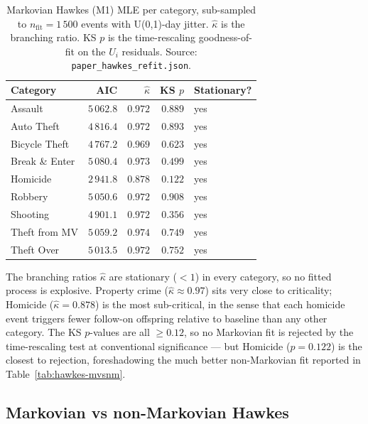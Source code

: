 \documentclass[11pt,a4paper]{article}
\newcommand{\1}{\mathbf{1}}
\theoremstyle{plain}
\theoremstyle{definition}
\begin{document}
\begin{table}[h]
\centering\small
\caption{Markovian Hawkes (M1) MLE per category, sub-sampled to
$n_{\mathrm{fit}} = 1\,500$ events with U(0,1)-day jitter.
$\hat\kappa$ is the branching ratio.  KS $p$ is the time-rescaling
goodness-of-fit on the $U_i$ residuals.  Source:
\texttt{paper\_hawkes\_refit.json}.}\label{tab:hawkes-markovian}
\begin{tabular}{lrrrl}
\toprule
Category & AIC & $\hat\kappa$ & KS $p$ & Stationary?\\\midrule
Assault                       & $5\,062.8$ & $0.972$ & $0.889$ & yes\\
Auto Theft                    & $4\,816.4$ & $0.972$ & $0.893$ & yes\\
Bicycle Theft                 & $4\,767.2$ & $0.969$ & $0.623$ & yes\\
Break \& Enter                & $5\,080.4$ & $0.973$ & $0.499$ & yes\\
Homicide                      & $2\,941.8$ & $0.878$ & $0.122$ & yes\\
Robbery                       & $5\,050.6$ & $0.972$ & $0.908$ & yes\\
Shooting                      & $4\,901.1$ & $0.972$ & $0.356$ & yes\\
Theft from MV                 & $5\,059.2$ & $0.974$ & $0.749$ & yes\\
Theft Over                    & $5\,013.5$ & $0.972$ & $0.752$ & yes\\
\bottomrule
\end{tabular}
\end{table}

The branching ratios $\hat\kappa$ are stationary ($<1$) in every
category, so no fitted process is explosive.  Property crime
($\hat\kappa\approx 0.97$) sits very close to criticality;
Homicide ($\hat\kappa = 0.878$) is the most sub-critical, in the
sense that each homicide event triggers fewer follow-on offspring
relative to baseline than any other category.  The KS $p$-values
are all $\ge 0.12$, so no Markovian fit is rejected by the
time-rescaling test at conventional significance — but
Homicide ($p=0.122$) is the closest to rejection, foreshadowing the
much better non-Markovian fit reported in
Table~\ref{tab:hawkes-mvsnm}.

\subsection{Markovian vs non-Markovian Hawkes}\label{sec:markov-nonmarkov}
\end{document}
